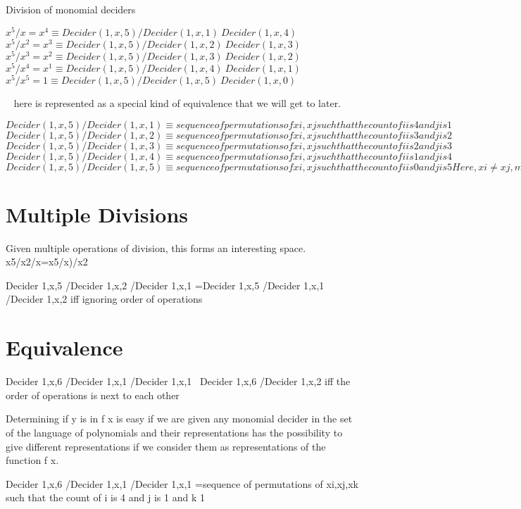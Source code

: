 Division of monomial deciders


$x^5 / x = x^4 \equiv Decider(1,x,5)/Decider(1,x,1) ~ Decider(1,x,4)$
$x^5 / x^2 = x^3 \equiv Decider(1,x,5)/Decider(1,x,2) ~ Decider(1,x,3)$
$x^5 / x^3 = x^2 \equiv Decider(1,x,5)/Decider(1,x,3) ~ Decider(1,x,2)$
$x^5 / x^4 = x^1 \equiv Decider(1,x,5)/Decider(1,x,4) ~ Decider(1,x,1)$
$x^5 / x^5 = 1 \equiv Decider(1,x,5)/Decider(1,x,5) ~ Decider(1,x,0)$

~ here is represented as a special kind of equivalence that we will get to later.

$Decider(1,x,5)/Decider(1,x,1) \equiv
 {sequence of permutations of {xi,xj} such that the count of i is 4 and j is 1}$
$Decider(1,x,5)/Decider(1,x,2) \equiv
 {sequence of permutations of {xi,xj} such that the count of i is 3 and j is 2}$
$Decider(1,x,5)/Decider(1,x,3) \equiv
 {sequence of permutations of {xi,xj} such that the count of i is 2 and j is 3}$
$Decider(1,x,5)/Decider(1,x,4) \equiv
 {sequence of permutations of {xi,xj} such that the count of i is 1 and j is 4}$
$Decider(1,x,5)/Decider(1,x,5) \equiv
 {sequence of permutations of {xi,xj} such that the count of i is 0 and j is 5} Here, xi \neq
 xj, meaning xi is of a different representation than xj$

\section{Multiple Divisions}

Given multiple operations of division, this forms an interesting space.
x5/x2/x=x5/x)/x2

Decider 1,x,5 /Decider 1,x,2 /Decider 1,x,1 =Decider 1,x,5 /Decider 1,x,1 /Decider 1,x,2
 iff ignoring order of operations
 
\section{Equivalence}

Decider 1,x,6 /Decider 1,x,1 /Decider 1,x,1 ~Decider 1,x,6 /Decider 1,x,2
  iff the order of operations is next to each other

Determining if y is in f x is easy if we are given any monomial decider in the set of the language of polynomials and their representations has the possibility to give different representations if we consider them as representations of the function f x.

Decider 1,x,6 /Decider 1,x,1 /Decider 1,x,1 =sequence of permutations of xi,xj,xk such that the count of i is 4 and j is 1 and k 1


